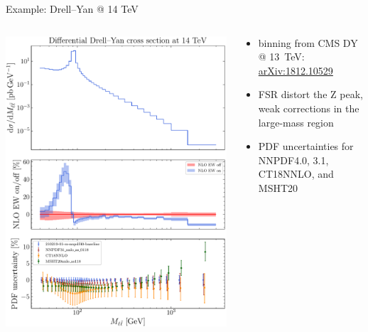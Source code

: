 \begin{frame}{Example: Drell--Yan @ 14 TeV}
\begin{columns}[T,onlytextwidth]
\begin{column}{0.5\textwidth}
\includegraphics[height=.9\textheight]{ew_corrections/figures/NNPDF40_DY_Z}
\end{column}
\begin{column}{0.5\textwidth}
\begin{itemize}
\vspace*{0.1cm}
\item binning from CMS DY @ \SI{13}{\tera\electronvolt}: \href{https://arxiv.org/abs/1812.10529}{arXiv:1812.10529}
\vspace*{2.3cm}
\item FSR distort the Z peak, weak corrections in the large-mass region
\vspace*{1.3cm}
\item PDF uncertainties for NNPDF4.0, 3.1, CT18NNLO, and MSHT20
\end{itemize}
\end{column}
\end{columns}
\end{frame}
